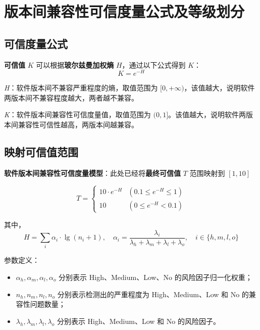 \documentclass[14pt,a4paper,UTF8,twoside]{article}
\begin{document}
\newpage{}

\section{版本间兼容性可信度量公式及等级划分}

\subsection{可信度量公式}

\textbf{可信值} \( K \) 可以根据\textbf{玻尔兹曼加权熵} \( H \)，通过以下公式得到 \( K \)：
\begin{equation}
    K = e^{-H} \tag{1}
\end{equation}

\noindent
\textit{H}：软件版本间不兼容严重程度的熵，取值范围为 \([0, +\infty)\)，该值越大，说明软件两版本间不兼容程度越大，两者越不兼容。

\noindent
\textit{K}：软件版本间兼容性可信度量值，取值范围为 \((0,1]\)。该值越大，说明软件两版本间兼容性可信性越高，两版本间越兼容。

\subsection{映射可信值范围}

\noindent
\textbf{软件版本间兼容性可信度量模型}：此处已经将\textbf{最终可信值} \( T \) 范围映射到 \([1, 10]\)

\[
T =
\begin{cases}
10 \cdot e^{-H} & (0.1 \leq e^{-H} \leq 1) \\
10 & (0 \leq e^{-H} < 0.1)
\end{cases} \tag{2}
\]

\noindent 其中，
\[
H = \sum_{i} \alpha_i \cdot \lg(n_i + 1), \quad \alpha_i = \frac{\lambda_i}{\lambda_h + \lambda_m + \lambda_l + \lambda_o}, \quad i \in \{h, m, l, o\} \tag{3}
\]

\noindent 参数定义：

\noindent
\begin{itemize}
    \item \( \alpha_h, \alpha_m, \alpha_l, \alpha_o \) 分别表示 High、Medium、Low、No 的风险因子归一化权重；
    \item \( n_h, n_m, n_l, n_o \) 分别表示检测出的严重程度为 High、Medium、Low 和 No 的兼容性问题数量；
    \item \( \lambda_h, \lambda_m, \lambda_l, \lambda_o \) 分别表示 High、Medium、Low 和 No 的风险因子。
\end{itemize}
\end{document}
